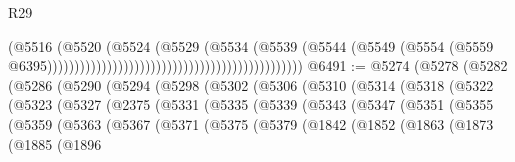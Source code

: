\begin{lexlean}{R29}
\begin{coremodule}
                                                                              (@5516
                                                                                (@5520
                                                                                  (@5524
                                                                                    (@5529
                                                                                      (@5534
                                                                                        (@5539
                                                                                          (@5544
                                                                                            (@5549
                                                                                              (@5554
                                                                                                (@5559
                                                                                                  @6395)))))))))))))))))))))))))))))))))))))))))))))))
@6491 := @5274
    (@5278
      (@5282
        (@5286
          (@5290
            (@5294
              (@5298
                (@5302
                  (@5306
                    (@5310
                      (@5314
                        (@5318
                          (@5322
                            (@5323
                              (@5327
                                (@2375
                                  (@5331
                                    (@5335
                                      (@5339
                                        (@5343
                                          (@5347
                                            (@5351
                                              (@5355
                                                (@5359
                                                  (@5363
                                                    (@5367
                                                      (@5371
                                                        (@5375
                                                          (@5379
                                                            (@1842
                                                              (@1852
                                                                (@1863
                                                                  (@1873
                                                                    (@1885
                                                                      (@1896

\end{coremodule}
\end{lexlean}
